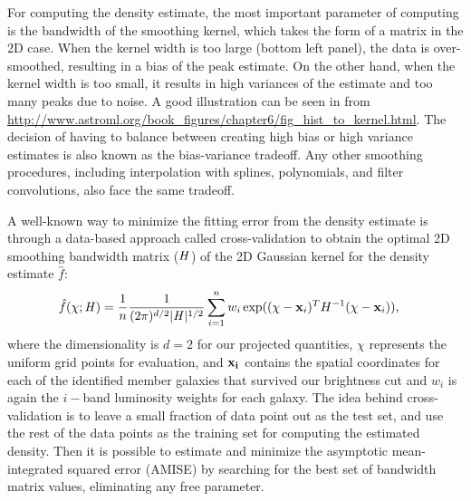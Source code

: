 For computing the density estimate, the most important parameter of computing 
is the bandwidth of the smoothing kernel, 
which takes the form of a matrix in the 2D case. 
When the kernel width is
too large (bottom left panel), the data is over-smoothed, 
resulting in a bias of the peak estimate. On the other hand, when the kernel
width is too small, it results in high variances of the estimate and 
too many peaks due to noise. 
A good illustration can be seen in \citealt{Vanderplas2012} from
\href{http://www.astroml.org/book\_figures/chapter6/fig\_hist\_to\_kernel.html}{http://www.astroml.org/book\_figures/chapter6/fig\_hist\_to\_kernel.html}.
The decision of having to balance between creating high
bias or high variance estimates is also known as the bias-variance tradeoff. 
Any other smoothing procedures, including interpolation with splines,
polynomials, and filter convolutions, also face the same tradeoff. 

A well-known way to minimize the fitting error from the density estimate is through
a data-based approach called cross-validation to obtain 
the optimal 2D smoothing
bandwidth matrix ($\mathbf{\it H}$) of the 2D Gaussian kernel for the
density estimate $\hat{f}$:
\begin{align}
	\hat{f}(\chi; \mathbf{\it H}) &= \frac{1}{n} \frac{1}{(2\pi)^{d/2}|\mathbf{\it H}|^{1/2}}
	\sum_{i=1}^n w_i \exp((\chi-{\bf x}_i)^T H^{-1} (\chi-{\bf x}_i)),
	\label{eq:cross_validated_bandwidth}
\end{align}
where the dimensionality is $d=2$ for our projected quantities,
$\chi$ represents the uniform grid points for evaluation, and 
$\bf{x}_i$ contains the spatial coordinates for each of the identified member 
galaxies that survived our brightness cut and $w_i$ is again the $i-$band
luminosity weights for each galaxy.
The idea behind cross-validation is to leave a small fraction of data point 
out as the test set, and use the rest of the data points as 
the training set for computing the estimated density.
Then it is possible to estimate and minimize the asymptotic mean-integrated squared error
(AMISE)  by searching
for the best set of bandwidth matrix values, eliminating any free parameter. 

